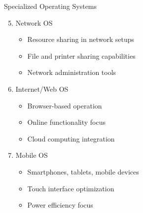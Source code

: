 \documentclass[aspectratio=169]{beamer}
\begin{document}
\begin{frame}{Specialized Operating Systems}
    \begin{enumerate}
        \setcounter{enumi}{4}
        \item Network OS
        \begin{itemize}
            \item Resource sharing in network setups
            \item File and printer sharing capabilities
            \item Network administration tools
        \end{itemize}
        
        \item Internet/Web OS
        \begin{itemize}
            \item Browser-based operation
            \item Online functionality focus
            \item Cloud computing integration
        \end{itemize}
        
        \item Mobile OS
        \begin{itemize}
            \item Smartphones, tablets, mobile devices
            \item Touch interface optimization
            \item Power efficiency focus
        \end{itemize}
    \end{enumerate}
    

\end{frame}
\end{document}
